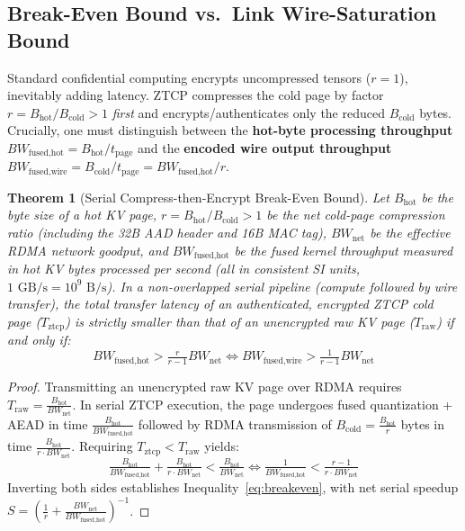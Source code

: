 \documentclass[10pt,twocolumn]{article}
\newtheorem{theorem}{Theorem}
\begin{document}
\subsection{Break-Even Bound vs.\ Link Wire-Saturation Bound}
Standard confidential computing encrypts uncompressed tensors ($r=1$), inevitably adding latency. ZTCP compresses the cold page by factor $r = B_{\text{hot}} / B_{\text{cold}} > 1$ \textit{first} and encrypts/authenticates only the reduced $B_{\text{cold}}$ bytes. Crucially, one must distinguish between the \textbf{hot-byte processing throughput} $BW_{\text{fused,hot}} = B_{\text{hot}} / t_{\text{page}}$ and the \textbf{encoded wire output throughput} $BW_{\text{fused,wire}} = B_{\text{cold}} / t_{\text{page}} = BW_{\text{fused,hot}} / r$.

\begin{theorem}[Serial Compress-then-Encrypt Break-Even Bound]
Let $B_{\text{hot}}$ be the byte size of a hot KV page, $r = B_{\text{hot}} / B_{\text{cold}} > 1$ be the net cold-page compression ratio (including the 32B AAD header and 16B MAC tag), $BW_{\text{net}}$ be the effective RDMA network goodput, and $BW_{\text{fused,hot}}$ be the fused kernel throughput measured in hot KV bytes processed per second (all in consistent SI units, $1\text{ GB/s} = 10^9\text{ B/s}$). In a non-overlapped serial pipeline (compute followed by wire transfer), the total transfer latency of an authenticated, encrypted ZTCP cold page ($T_{\text{ztcp}}$) is strictly smaller than that of an unencrypted raw KV page ($T_{\text{raw}}$) if and only if:
{\small
\begin{equation}
    BW_{\text{fused,hot}} > \tfrac{r}{r - 1} BW_{\text{net}}
    \iff BW_{\text{fused,wire}} > \tfrac{1}{r - 1} BW_{\text{net}}
    \label{eq:breakeven}
\end{equation}
}
\end{theorem}

\begin{proof}
Transmitting an unencrypted raw KV page over RDMA requires $T_{\text{raw}} = \frac{B_{\text{hot}}}{BW_{\text{net}}}$. In serial ZTCP execution, the page undergoes fused quantization + AEAD in time $\frac{B_{\text{hot}}}{BW_{\text{fused,hot}}}$ followed by RDMA transmission of $B_{\text{cold}} = \frac{B_{\text{hot}}}{r}$ bytes in time $\frac{B_{\text{hot}}}{r \cdot BW_{\text{net}}}$. Requiring $T_{\text{ztcp}} < T_{\text{raw}}$ yields:
{\footnotesize
\begin{equation*}
    \tfrac{B_{\text{hot}}}{BW_{\text{fused,hot}}} + \tfrac{B_{\text{hot}}}{r \cdot BW_{\text{net}}} < \tfrac{B_{\text{hot}}}{BW_{\text{net}}}
    \iff \tfrac{1}{BW_{\text{fused,hot}}} < \tfrac{r - 1}{r \cdot BW_{\text{net}}}
\end{equation*}
}
Inverting both sides establishes Inequality~\eqref{eq:breakeven}, with net serial speedup $S = \left(\frac{1}{r} + \frac{BW_{\text{net}}}{BW_{\text{fused,hot}}}\right)^{-1}$.
\end{proof}
\end{document}
